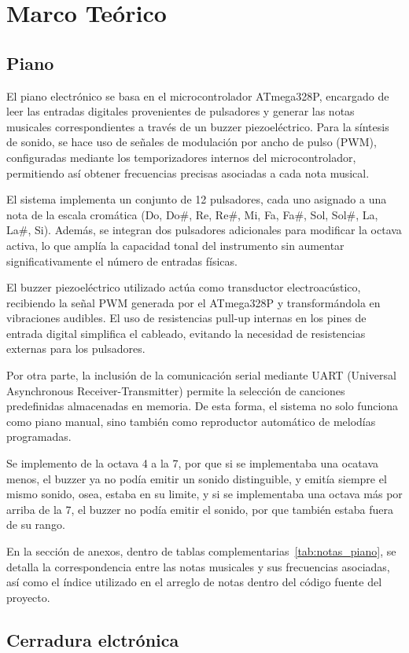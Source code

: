 \section{Marco Teórico}

\subsection{Piano}
El piano electrónico se basa en el microcontrolador ATmega328P, encargado de leer las entradas digitales provenientes de pulsadores y generar las notas musicales correspondientes a través de un buzzer piezoeléctrico. Para la síntesis de sonido, se hace uso de señales de modulación por ancho de pulso (PWM), configuradas mediante los temporizadores internos del microcontrolador, permitiendo así obtener frecuencias precisas asociadas a cada nota musical.

El sistema implementa un conjunto de 12 pulsadores, cada uno asignado a una nota de la escala cromática (Do, Do\#, Re, Re\#, Mi, Fa, Fa\#, Sol, Sol\#, La, La\#, Si). Además, se integran dos pulsadores adicionales para modificar la octava activa, lo que amplía la capacidad tonal del instrumento sin aumentar significativamente el número de entradas físicas.

El buzzer piezoeléctrico utilizado actúa como transductor electroacústico, recibiendo la señal PWM generada por el ATmega328P y transformándola en vibraciones audibles. El uso de resistencias pull-up internas en los pines de entrada digital simplifica el cableado, evitando la necesidad de resistencias externas para los pulsadores.

Por otra parte, la inclusión de la comunicación serial mediante UART (Universal Asynchronous Receiver-Transmitter) permite la selección de canciones predefinidas almacenadas en memoria. De esta forma, el sistema no solo funciona como piano manual, sino también como reproductor automático de melodías programadas.

Se implemento de la octava 4 a la 7, por que si se implementaba una ocatava menos, el buzzer ya no podía emitir un sonido distinguible, y emitía siempre el mismo sonido, osea, estaba en su limite, y si se implementaba una octava más por arriba de la 7, el buzzer no podía emitir el sonido, por que también estaba fuera de su rango.

En la sección de anexos, dentro de tablas complementarias~\ref{tab:notas_piano}, se detalla la correspondencia entre las notas musicales y sus frecuencias asociadas, así como el índice utilizado en el arreglo de notas dentro del código fuente del proyecto.

\subsection{Cerradura elctrónica}

